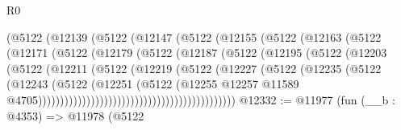 \begin{lexlean}{R0}
\begin{coremodule}
                              (@5122
                                (@12139
                                  (@5122
                                    (@12147
                                      (@5122
                                        (@12155
                                          (@5122
                                            (@12163
                                              (@5122
                                                (@12171
                                                  (@5122
                                                    (@12179
                                                      (@5122
                                                        (@12187
                                                          (@5122
                                                            (@12195
                                                              (@5122
                                                                (@12203
                                                                  (@5122
                                                                    (@12211
                                                                      (@5122
                                                                        (@12219
                                                                          (@5122
                                                                            (@12227
                                                                              (@5122
                                                                                (@12235
                                                                                  (@5122
                                                                                    (@12243
                                                                                      (@5122
                                                                                        (@12251
                                                                                          (@5122
                                                                                            (@12255
                                                                                              @12257
                                                                                              @11589
                                                                                              @4705)))))))))))))))))))))))))))))))))))))))))))))
@12332 := @11977
    (fun (__b : @4353) =>
    @11978
      (@5122

\end{coremodule}
\end{lexlean}
